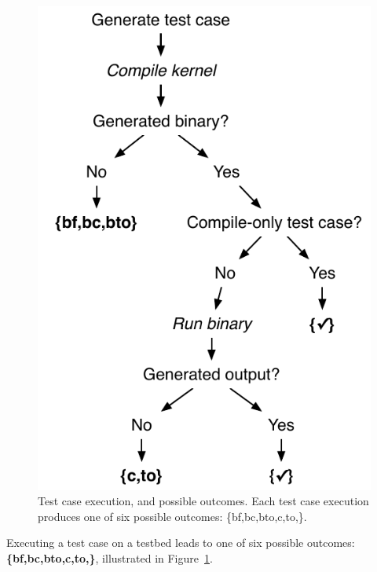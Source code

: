 \begin{figure}
	\centering %
	\includegraphics[width=.62\columnwidth]{img/test_process}%
	\caption{%
		Test case execution, and possible outcomes. Each test case execution produces one of six possible outcomes: \{bf,bc,bto,c,to,\cmark\}.%
	}%
	\label{fig:test-process} %
\end{figure}


Executing a test case on a testbed leads to one of six possible outcomes: \textbf{\{bf,bc,bto,c,to,\cmark\}}, illustrated in Figure~\ref{fig:test-process}.

